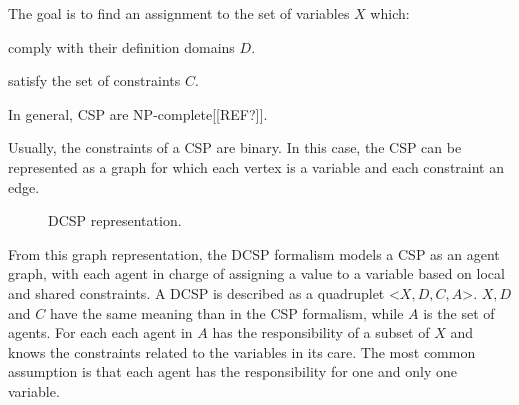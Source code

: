 The goal is to find an assignment to the set of variables $X$ which:
\begin{compactitem}
\item comply with their definition domains $D$.
\item satisfy the set of constraints $C$.
\end{compactitem}

In general, CSP are NP-complete[[REF?]].

Usually, the constraints of a CSP are binary. In this case, the CSP can be represented as a graph for which each vertex is a variable and each constraint an edge.

\begin{figure}[]
\centering
{}\hfill%

\caption{DCSP representation.}
\label{dcsp}

\end{figure}

From this graph representation, the DCSP formalism\cite{yokoo1998distributed} models a CSP  as an agent graph, with each agent in charge of assigning a value to a variable based on local and shared constraints. A DCSP is described as a quadruplet <$X, D, C, A$>. $X, D$ and $C$ have the same meaning than in the CSP formalism, while $A$ is the set of agents. For each each agent in $A$ has the responsibility of a subset of $X$ and knows the constraints related to the variables in its care. The most common assumption is that each agent has the responsibility for one and only one variable.

